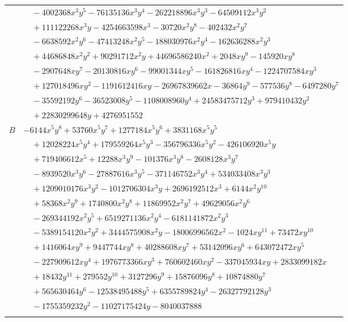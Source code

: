 \documentclass[11pt]{article}
\begin{document}
\begin{longtable}{@{}ll@{}}
 & $\quad -4002368x^{3}y^{5}-76135136x^{3}y^{4}-262218896x^{3}y^{3}-64509112x^{3}y^{2}$\\
 & $\quad +111122268x^{3}y-4254663598x^{3}-30720x^{2}y^{8}-402432x^{2}y^{7}$\\
 & $\quad -6638592x^{2}y^{6}-47413248x^{2}y^{5}-188030976x^{2}y^{4}-162636288x^{2}y^{3}$\\
 & $\quad +44686848x^{2}y^{2}+90291712x^{2}y+44696586240x^{2}+2048xy^{9}-145920xy^{8}$\\
 & $\quad -2907648xy^{7}-20130816xy^{6}-99001344xy^{5}-161826816xy^{4}-1224707584xy^{3}$\\
 & $\quad +127018496xy^{2}-1191612416xy-26967839662x-36864y^{9}-577536y^{8}-6497280y^{7}$\\
 & $\quad -35592192y^{6}-36523008y^{5}-1108008960y^{4}+24583475712y^{3}+979410432y^{2}$\\
 & $\quad +22830299648y+4276951552$\\
$B$ & $-6144x^{5}y^{8}+53760x^{5}y^{7}+1277184x^{5}y^{6}+3831168x^{5}y^{5}$\\
 & $\quad +12028224x^{5}y^{4}+179559264x^{5}y^{3}-356796336x^{5}y^{2}-426106920x^{5}y$\\
 & $\quad +719406612x^{5}+12288x^{3}y^{9}-101376x^{3}y^{8}-2608128x^{3}y^{7}$\\
 & $\quad -8939520x^{3}y^{6}-27887616x^{3}y^{5}-371146752x^{3}y^{4}+534033408x^{3}y^{3}$\\
 & $\quad +1209010176x^{3}y^{2}-1012706304x^{3}y+2696192512x^{3}+6144x^{2}y^{10}$\\
 & $\quad +58368x^{2}y^{9}+1740800x^{2}y^{8}+11869952x^{2}y^{7}+49629056x^{2}y^{6}$\\
 & $\quad -269344192x^{2}y^{5}+6519271136x^{2}y^{4}-6181141872x^{2}y^{3}$\\
 & $\quad -5389154120x^{2}y^{2}+3444575908x^{2}y-18006996562x^{2}-1024xy^{11}+73472xy^{10}$\\
 & $\quad +1416064xy^{9}+9447744xy^{8}+40288608xy^{7}+53142096xy^{6}+643072472xy^{5}$\\
 & $\quad -227909612xy^{4}+1976773366xy^{3}+760602460xy^{2}-337045934xy+2833099182x$\\
 & $\quad +18432y^{11}+279552y^{10}+3127296y^{9}+15876096y^{8}+10874880y^{7}$\\
 & $\quad +565630464y^{6}-12538495488y^{5}+6355789824y^{4}-26327792128y^{3}$\\
 & $\quad -1755359232y^{2}-11027175424y-8040037888$\\
\addlinespace[3pt]
\multicolumn{2}{@{}l}{$i=86$, $m=1$, neighbours $111,0,58,104$}\\

\end{longtable}
\end{document}
